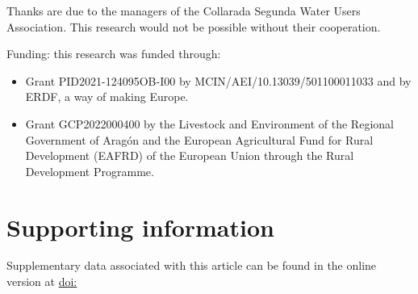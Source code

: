 \documentclass[review,authoryear]{elsarticle}
\begin{document}
Thanks are due to the managers of the Collarada Segunda Water Users Association.
This research would not be possible without their cooperation.

Funding: this research was funded through:
\begin{itemize}
\item Grant PID2021-124095OB-I00 by MCIN/AEI/10.13039/501100011033 and by ERDF,
	a way of making Europe.
\item Grant GCP2022000400 by the Livestock and Environment of the Regional
	Government of Aragón and the European Agricultural Fund for Rural
	Development (EAFRD) of the European Union through the Rural Development
	Programme.
\end{itemize}

\appendix
\section{Supporting information}
Supplementary data associated with this article can be found in the online
version at \url{doi:}



\end{document}
